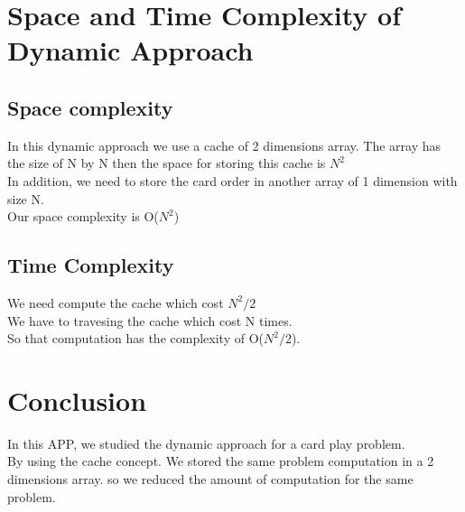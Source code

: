 \documentclass{article}
\begin{document}
\section{Space and Time Complexity of Dynamic Approach}
\subsection{Space complexity}
In this dynamic approach we use a cache of 2 dimensions array. The array has the size of N by N then the space for storing this cache is $N^{2}$
\\[0.3cm]
In addition, we need to store the card order in another array of 1 dimension with size N.
\\[0.3cm]
Our space complexity is O($N^{2 }$)

\subsection{Time Complexity}

We need compute the cache which cost $N^{2}/2$
\\[0.3cm]
We have to travesing the cache which cost N times.
\\[0.3cm]
So that computation has the complexity of O($N^{2}/2$).


\section{Conclusion}
In this APP, we studied the dynamic approach for a card play problem.
\\[0.5cm]
By using the cache concept. We stored the same problem computation in a 2 dimensions array. so we reduced the amount of computation for the same problem.
\end{document}
